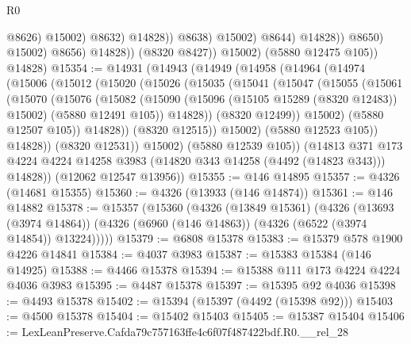 \begin{lexlean}{R0}
\begin{coremodule}
                                          @8626)
                                        @15002)
                                      @8632)
                                    @14828))
                                @8638)
                              @15002)
                            @8644)
                          @14828))
                      @8650)
                    @15002)
                  @8656)
                @14828))
            (@8320 @8427))
          @15002)
        (@5880 @12475 @105))
      @14828)
@15354 := @14931
    (@14943
      (@14949
        (@14958
          (@14964
            (@14974
              (@15006
                (@15012
                  (@15020
                    (@15026
                      (@15035
                        (@15041
                          (@15047
                            (@15055
                              (@15061
                                (@15070
                                  (@15076
                                    (@15082
                                      (@15090
                                        (@15096 (@15105 @15289 (@8320 @12483)) @15002)
                                        (@5880 @12491 @105))
                                      @14828))
                                  (@8320 @12499))
                                @15002)
                              (@5880 @12507 @105))
                            @14828))
                        (@8320 @12515))
                      @15002)
                    (@5880 @12523 @105))
                  @14828))
              (@8320 @12531))
            @15002)
          (@5880 @12539 @105))
        (@14813
          @371
          @173
          @4224
          @4224
          @14258
          @3983
          (@14820 @343 @14258 (@4492 (@14823 @343)))
          @14828))
      (@12062 @12547 @13956))
@15355 := @146 @14895
@15357 := @4326 (@14681 @15355)
@15360 := @4326 (@13933 (@146 @14874))
@15361 := @146 @14882
@15378 := @15357
    (@15360
      (@4326
        (@13849 @15361)
        (@4326
          (@13693 (@3974 @14864))
          (@4326 (@6960 (@146 @14863)) (@4326 (@6522 (@3974 @14854)) @13224)))))
@15379 := @6808 @15378
@15383 := @15379 @578 @1900 @4226 @14841
@15384 := @4037 @3983
@15387 := @15383 @15384 (@146 @14925)
@15388 := @4466 @15378
@15394 := @15388 @111 @173 @4224 @4224 @4036 @3983
@15395 := @4487 @15378
@15397 := @15395 @92 @4036
@15398 := @4493 @15378
@15402 := @15394 (@15397 (@4492 (@15398 @92)))
@15403 := @4500 @15378
@15404 := @15402 @15403
@15405 := @15387 @15404
@15406 := LexLeanPreserve.Cafda79c757163ffe4c6f07f487422bdf.R0.__rel_28

\end{coremodule}
\end{lexlean}
